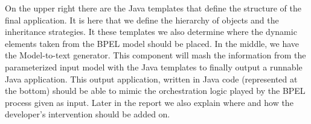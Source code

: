 On the upper right there are the Java templates that define the structure of the final application. It is here that we define the hierarchy of objects and the inheritance strategies. It these templates we also determine where the dynamic elements taken from the BPEL model should be placed.  
In the middle, we have the Model-to-text generator. This component will mash the information from the parameterized input model with the Java templates to finally output a runnable Java application. This output application, written in Java code (represented at the bottom) should be able to mimic the orchestration logic played by the BPEL process given as input.  
Later in the report we also explain where and how the developer's intervention should be added on.








